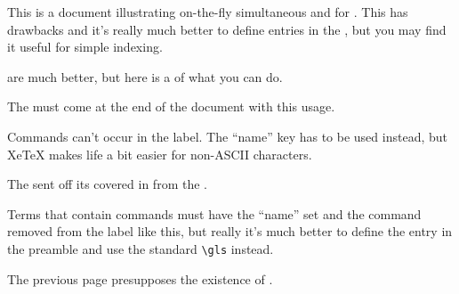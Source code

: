 \documentclass{article}
\begin{document}
This is a  document illustrating on-the-fly
simultaneous  and 
for  
. This has 
drawbacks and it's really much better to define entries in the 
, but you may find it useful for simple 
indexing.

\newpage

  are much better,
but here is a  of what you can do.

\newpage
The  must come at the end of the document 
with this usage.

\newpage
Commands can't occur in the label. The ``name'' key has to be
used instead, but XeTeX makes life a bit easier for non-ASCII
characters. 

The  
 sent 
off its  covered in 
 from the .

Terms that contain commands must have the ``name'' set and the 
command removed from the label 
 like this, but
really it's much better to define the entry in the preamble
and use the standard \verb|\gls| instead.

\newpage
The previous page presupposes the existence of 
.

\newpage

\printglossaries
\end{document}
